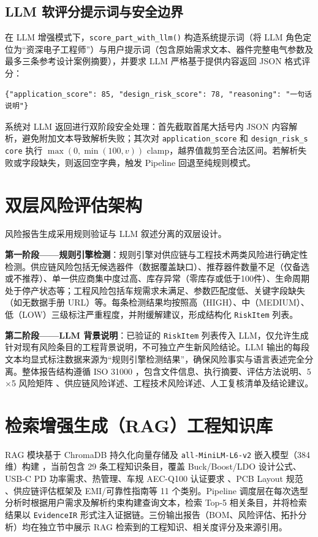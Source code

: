 \subsection{LLM 软评分提示词与安全边界}

在 LLM 增强模式下，\texttt{score\_part\_with\_llm()} 构造系统提示词（将 LLM 角色定位为“资深电子工程师”）与用户提示词（包含原始需求文本、器件完整电气参数及最多三条参考设计案例摘要），并要求 LLM 严格基于提供内容返回 JSON 格式评分：
\begin{lstlisting}[caption={LLM 评分返回格式},label={lst:llm_fmt}]
{"application_score": 85, "design_risk_score": 78, "reasoning": "一句话说明"}
\end{lstlisting}

系统对 LLM 返回进行双阶段安全处理：首先截取首尾大括号内 JSON 内容解析，避免附加文本导致解析失败；其次对 \texttt{application\_score} 和 \texttt{design\_risk\_s\\core} 执行 $\max(0, \min(100, v))$ clamp，越界值裁剪至合法区间。若解析失败或字段缺失，则返回空字典，触发 Pipeline 回退至纯规则模式。

\section{双层风险评估架构}

风险报告生成采用规则验证与 LLM 叙述分离的双层设计。

\textbf{第一阶段——规则引擎检测}：规则引擎对供应链与工程技术两类风险进行确定性检测。供应链风险包括无候选器件（数据覆盖缺口）、推荐器件数量不足（仅备选或不推荐）、单一供应商集中度过高、库存异常（零库存或低于100件）、生命周期处于停产状态等；工程风险包括车规需求未满足、参数匹配度低、关键字段缺失（如无数据手册 URL）等。每条检测结果均按照高（HIGH）、中（MEDIUM）、低（LOW）三级标注严重程度，并附缓解建议，形成结构化 \texttt{RiskItem} 列表。

\textbf{第二阶段——LLM 背景说明}：已验证的 \texttt{RiskItem} 列表传入 LLM，仅允许生成针对现有风险条目的工程背景说明，不可独立产生新风险结论。LLM 输出的每段文本均显式标注数据来源为“规则引擎检测结果”，确保风险事实与语言表述完全分离。整体报告结构遵循 ISO 31000 \cite{iso31000}，包含文件信息、执行摘要、评估方法说明、5$\times$5 风险矩阵 \cite{iec60812}、供应链风险详述、工程技术风险详述、人工复核清单及结论建议。

\section{检索增强生成（RAG）工程知识库}

RAG 模块基于 ChromaDB 持久化向量存储及 \texttt{all-MiniLM-L6-v2} 嵌入模型（384 维）构建 \cite{lewis2020rag}，当前包含 29 条工程知识条目，覆盖 Buck/Boost/LDO 设计公式、USB-C PD 功率需求、热管理、车规 AEC-Q100 认证要求 \cite{aecq100}、PCB Layout 规范 \cite{ipc2221,ipc2152}、供应链评估框架及 EMI/可靠性指南等 11 个类别。Pipeline 调度层在每次选型分析时根据用户需求及解析约束构建查询文本，检索 Top-5 相关条目，并将检索结果以 \texttt{EvidenceIR} 形式注入证据链。三份输出报告（BOM、风险评估、拓扑分析）均在独立节中展示 RAG 检索到的工程知识、相关度评分及来源引用。
